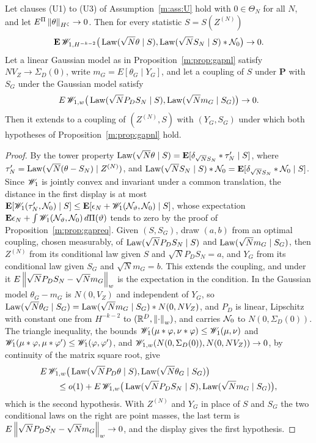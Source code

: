 \begin{lemma}\label{m:lem:gapred}
Let clauses (U1) to (U3) of Assumption~\ref{m:ass:U} hold with $0\in\Theta_N$ for all $N$, and let $E^\Pi\left\|\theta\right\|_{H^\zeta}\to0$. Then for every statistic $S=S(Z^{(N)})$
\[
\mathbf E\,\mathscr{W}_{1,H^{-k-2}}\big(\operatorname{Law}(\sqrt N\theta\mid S),\operatorname{Law}(\sqrt NS_N\mid S)*\mathcal{N}_0\big)\to0 .
\]
Let a linear Gaussian model as in Proposition~\ref{m:prop:gapnl} satisfy $NV_Z\to\Sigma_D(0)$, write $m_G=E[\theta_G\mid Y_G]$, and let a coupling of $S$ under $\mathbf P$ with $S_G$ under the Gaussian model satisfy
\[
E\,\mathscr{W}_{1,w}\big(\operatorname{Law}(\sqrt NP_DS_N\mid S),\operatorname{Law}(\sqrt Nm_G\mid S_G)\big)\to0 .
\]
Then it extends to a coupling of $(Z^{(N)},S)$ with $(Y_G,S_G)$ under which both hypotheses of Proposition~\ref{m:prop:gapnl} hold.
\end{lemma}

\begin{proof}
By the tower property $\operatorname{Law}(\sqrt N\theta\mid S)=\mathbf E[\delta_{\sqrt NS_N}*\tau'_N\mid S]$, where $\tau'_N=\operatorname{Law}(\sqrt N(\theta-S_N)\mid Z^{(N)})$, and $\operatorname{Law}(\sqrt NS_N\mid S)*\mathcal{N}_0=\mathbf E[\delta_{\sqrt NS_N}*\mathcal{N}_0\mid S]$. Since $\mathscr{W}_1$ is jointly convex and invariant under a common translation, the distance in the first display is at most $\mathbf E[\mathscr{W}_1(\tau'_N,\mathcal{N}_0)\mid S]\le\mathbf E[\epsilon_N+\mathscr{W}_1(\mathcal{N}_\vartheta,\mathcal{N}_0)\mid S]$, whose expectation $\mathbf E\epsilon_N+\int\mathscr{W}_1(\mathcal{N}_\vartheta,\mathcal{N}_0)\,d\Pi(\vartheta)$ tends to zero by the proof of Proposition~\ref{m:prop:gapreq}. Given $(S,S_G)$, draw $(a,b)$ from an optimal coupling, chosen measurably, of $\operatorname{Law}(\sqrt NP_DS_N\mid S)$ and $\operatorname{Law}(\sqrt Nm_G\mid S_G)$, then $Z^{(N)}$ from its conditional law given $S$ and $\sqrt NP_DS_N=a$, and $Y_G$ from its conditional law given $S_G$ and $\sqrt Nm_G=b$. This extends the coupling, and under it $E\left\|\sqrt NP_DS_N-\sqrt Nm_G\right\|_w$ is the expectation in the condition. In the Gaussian model $\theta_G-m_G$ is $N(0,V_Z)$ and independent of $Y_G$, so $\operatorname{Law}(\sqrt N\theta_G\mid S_G)=\operatorname{Law}(\sqrt Nm_G\mid S_G)*N(0,NV_Z)$, and $P_D$ is linear, Lipschitz with constant one from $H^{-k-2}$ to $(\mathbb{R}^D,\left\|\cdot\right\|_w)$, and carries $\mathcal{N}_0$ to $N(0,\Sigma_D(0))$. The triangle inequality, the bounds $\mathscr{W}_1(\mu*\varphi,\nu*\varphi)\le\mathscr{W}_1(\mu,\nu)$ and $\mathscr{W}_1(\mu*\varphi,\mu*\varphi')\le\mathscr{W}_1(\varphi,\varphi')$, and $\mathscr{W}_{1,w}(N(0,\Sigma_D(0)),N(0,NV_Z))\to0$, by continuity of the matrix square root, give
\[
\begin{aligned}
&E\,\mathscr{W}_{1,w}\big(\operatorname{Law}(\sqrt NP_D\theta\mid S),\operatorname{Law}(\sqrt N\theta_G\mid S_G)\big)\\
&\qquad\le o(1)+E\,\mathscr{W}_{1,w}\big(\operatorname{Law}(\sqrt NP_DS_N\mid S),\operatorname{Law}(\sqrt Nm_G\mid S_G)\big),
\end{aligned}
\]
which is the second hypothesis. With $Z^{(N)}$ and $Y_G$ in place of $S$ and $S_G$ the two conditional laws on the right are point masses, the last term is $E\left\|\sqrt NP_DS_N-\sqrt Nm_G\right\|_w\to0$, and the display gives the first hypothesis.
\end{proof}

